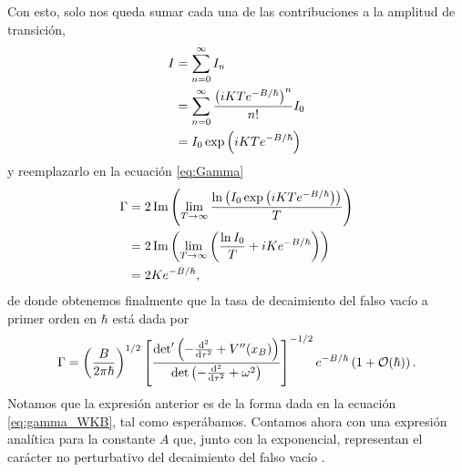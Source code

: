 Con esto, solo nos queda sumar cada una de las contribuciones a la amplitud de transición,
\begin{align}
	I &= \sum_{n = 0}^{\infty} I_n \\
	&= \sum_{n = 0}^{\infty} \frac{\left(iKTe^{-B/\hbar}\right)^n}{n!} I_0 \\
	&= I_0 \exp\qty(iKTe^{-B/\hbar})
\end{align}
y reemplazarlo en la ecuación \eqref{eq:Gamma}
\begin{align}
	\Gamma &= 2\Im\qty(\lim_{T \rightarrow \infty} \frac{ \ln \qty(I_0 \exp\qty(iKTe^{-B/\hbar}))}{T}) \\
	&= 2 \Im \qty(\lim_{T \rightarrow \infty} \qty( \frac{\ln I_0}{T} + iKe^{-B/\hbar})) \\
	&= 2 Ke^{-B/\hbar},
\end{align}
de donde obtenemos finalmente que la tasa de decaimiento del falso vacío a primer orden en $\hbar$ está dada por
\begin{equation} \label{eq:gamma_final}
\Gamma = \left(\frac{B}{2\pi\hbar}\right)^{1/2}  \left[ \frac{\textrm{det}' \left(-\dv[2]{}{\tau} + V''(x_B) \right)}{\det \left(-\dv[2]{}{\tau} + \omega^2 \right)} \right]^{-1/2}e^{-B/\hbar}\left( 1 + \mathcal{O}(\hbar)\right).
\end{equation}
Notamos que la expresión anterior
es de la forma dada en la ecuación \eqref{eq:gamma_WKB},
tal como esperábamos. Contamos ahora con una expresión analítica para la constante $A$ que, junto con la exponencial, representan el carácter no perturbativo del decaimiento del falso vacío \cite{weinberg2012classical}.  


